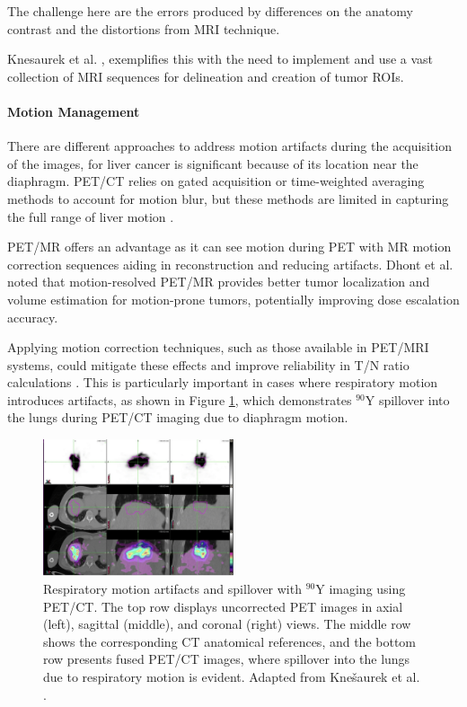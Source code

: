 The challenge here are the errors produced by differences on the anatomy contrast and the distortions from MRI technique.

Knesaurek et al. \cite{knesaurek2018}, exemplifies this with the need to implement and use a vast collection of MRI sequences for delineation and creation of tumor ROIs. 

\paragraph{Motion Management}

There are different approaches to address motion artifacts during the acquisition of the images, for liver cancer is significant because of its location near the diaphragm. PET/CT relies on gated acquisition or time-weighted averaging methods to account for motion blur, but these methods are limited in capturing the full range of liver motion \cite{Dhont2020}. 

PET/MR offers an advantage as it can see motion during PET with MR motion correction sequences %
aiding in reconstruction and reducing artifacts\cite{knesaurek2018}. Dhont et al. \cite{Dhont2020} noted that motion-resolved PET/MR provides better tumor localization and volume estimation for motion-prone tumors, potentially improving dose escalation accuracy.

Applying motion correction techniques, %
such as those available in PET/MRI systems, could mitigate these effects and improve reliability in T/N ratio calculations \cite{knesaurek2018}. This is particularly important in cases where respiratory motion introduces artifacts, as shown in Figure \ref{fig:respiratory_motion_artifacts}, which demonstrates $^{90}\text{Y}$ spillover into the lungs during PET/CT imaging due to diaphragm motion.


\begin{figure}[H]
	\centering
	\includegraphics[width=0.5\textwidth]{assets/Respiratory_Motion_Artifacts.png} 
	\caption{Respiratory motion artifacts and spillover with \(^{90}\text{Y}\) imaging using PET/CT. The top row displays uncorrected PET images in axial (left), sagittal (middle), and coronal (right) views. The middle row shows the corresponding CT anatomical references, and the bottom row presents fused PET/CT images, where spillover into the lungs due to respiratory motion is evident. Adapted from Knešaurek et al. \cite{knesaurek2018}.}
	\label{fig:respiratory_motion_artifacts}
\end{figure}



